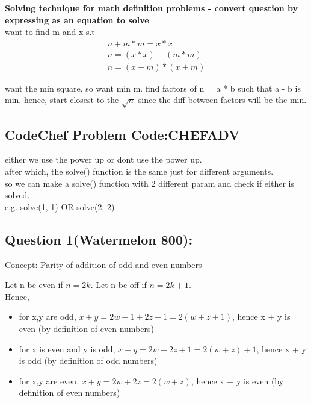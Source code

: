 \documentclass[12pt]{article}
\begin{document}
{{\textbf{Solving technique for math definition problems - convert question by expressing as an equation to solve}} \\
want to find m and x s.t 
\begin{align}
	n + m * m = x * x \\
	n = (x * x) - (m * m) \\
	n = (x - m) * (x + m) 
 \end{align} 
 
 want the min square, so want min m. 
 find factors of n = a * b such that a - b is min. 
 hence, start closest to the \(\sqrt{n}\) since the diff between factors will be the min. 
 
 \subsection{CodeChef Problem Code:CHEFADV} 
 either we use the power up or dont use the power up. \\
 after which, the solve() function is the same just for different arguments. \\
 so we can make a solve() function with 2 different param and check if either is solved. \\
 e.g. solve(1, 1) OR solve(2, 2)

\subsection{Question 1(Watermelon 800):}  

{\underline{Concept: Parity of addition of odd and even numbers}}  

Let n be even if \( n = 2k \). 
Let n be off if \( n = 2k + 1 \). \\ [\baselineskip]

Hence, 

\begin{itemize} 
	\item for x,y are odd, \(x + y = 2w + 1 + 2z + 1 = 2(w + z + 1)\), hence x + y is even (by definition of even numbers) 
	\item for x is even and y is odd, \( x + y = 2w + 2z + 1 = 2(w + z) + 1\), hence x + y is odd (by definition of odd numbers) 
	\item for x,y are even, \( x + y = 2w + 2z = 2(w + z)\), hence x + y is even (by definition of even numbers) \\ [\baselineskip]
 \end{itemize} 
 
 
}
\end{document}
